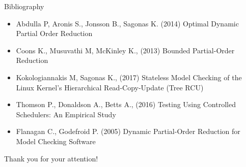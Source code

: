 \documentclass[9pt]{beamer}
\begin{document}
\begin{frame}{Bibliography}
    \begin{itemize}
        \item Abdulla P, Aronis S., Jonsson B., Sagonas K. (2014) Optimal Dynamic Partial Order Reduction
        \item Coons K., Musuvathi M, McKinley K., (2013) Bounded Partial-Order Reduction 
        \item Kokologiannakis M, Sagonas K., (2017) Stateless Model Checking of the Linux Kernel’s Hierarchical Read-Copy-Update (Tree RCU)
        \item Thomson P., Donaldson A., Betts A., (2016) Testing Using Controlled Schedulers: An Empirical Study
        \item Flanagan C., Godefroid P. (2005) Dynamic Partial-Order Reduction for Model Checking Software 
    \end{itemize}
    
\end{frame}

\begin{frame}
    Thank you for your attention!
\end{frame}
\end{document}
